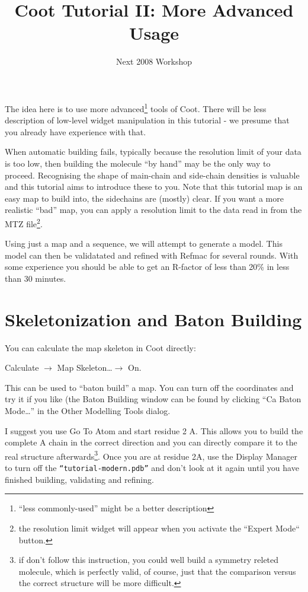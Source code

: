 \documentclass{article}
\title{Coot Tutorial II: More Advanced Usage}
\author{Next 2008 Workshop}
\begin{document}
\maketitle

The idea here is to use more advanced\footnote{``less commonly-used''
  might be a better description} tools of Coot.  There will be less
description of low-level widget manipulation in this tutorial - we
presume that you already have experience with that.

When automatic building fails, typically because the resolution limit
of your data is too low, then building the molecule ``by hand'' may be
the only way to proceed.  Recognising the shape of main-chain and
side-chain densities is valuable and this tutorial aims to introduce
these to you.  Note that this tutorial map is an easy map to build
into, the sidechains are (mostly) clear.  If you want a more realistic
``bad'' map, you can apply a resolution limit to the data read in from
the MTZ file\footnote{the resolution limit widget will appear when you
  activate the ``Expert Mode`` button.}.

Using just a map and a sequence, we will attempt to generate a model.
This model can then be validatated and refined with Refmac for several
rounds.  With some experience you should be able to get an R-factor of
less than 20\% in less than 30 minutes.

\section{Skeletonization and Baton Building}


You can calculate the map skeleton in Coot directly:

\textsf{Calculate $\rightarrow$ Map Skeleton\ldots $\rightarrow$ On.}

This can be used to ``baton build'' a map.  You can turn off the
coordinates and try it if you like (the Baton Building window can be
found by clicking \textsf{``Ca Baton Mode\ldots''} in the Other
Modelling Tools dialog.
  
I suggest you use Go To Atom and start residue 2 A. This allows you to
build the complete A chain in the correct direction and you can
directly compare it to the real structure afterwards\footnote{if don't
  follow this instruction, you could well build a symmetry releted
  molecule, which is perfectly valid, of course, just that the
  comparison versus the correct structure will be more difficult.}.
Once you are at residue 2A, use the Display Manager to turn off the
{\small\texttt{``tutorial-modern.pdb''}} and don't look at it again
until you have finished building, validating and refining.
  
\end{document}
